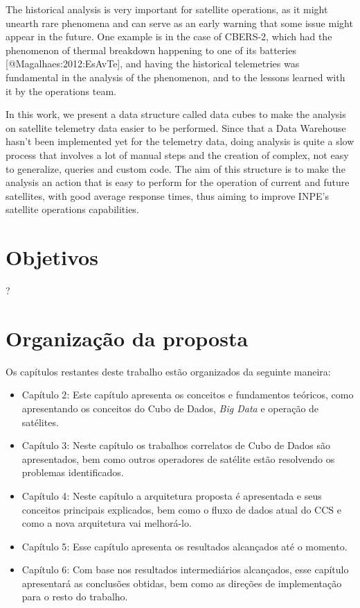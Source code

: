 The historical analysis is very important for satellite operations, as it might unearth rare phenomena and can serve as an early warning that some issue might appear in the future.
One example is in the case of CBERS-2, which had the phenomenon of thermal breakdown happening to one of its batteries [@Magalhaes:2012:EsAvTe], and having the historical telemetries was fundamental in the analysis of the phenomenon, and to the lessons learned with it by the operations team.

In this work, we present a data structure called data cubes to make the analysis on satellite telemetry data easier to be performed.
Since that a Data Warehouse hasn't been implemented yet for the telemetry data, doing analysis is quite a slow process that involves a lot of manual steps and the creation of complex, not easy to generalize, queries and custom code.
The aim of this structure is to make the analysis an action that is easy to perform for the operation of current and future satellites, with good average response times, thus aiming to improve INPE's satellite operations capabilities.

\section{Objetivos}

{\color{red} ?}

\section{Organização da proposta}

Os capítulos restantes deste trabalho estão organizados da seguinte maneira:

\begin{itemize}
	\item{Capítulo 2}: Este capítulo apresenta os conceitos e fundamentos teóricos, como apresentando os conceitos do Cubo de Dados, \textit{Big Data} e operação de satélites.
	\item{Capítulo 3}: Neste capítulo os trabalhos correlatos de Cubo de Dados são apresentados, bem como outros operadores de satélite estão resolvendo os problemas identificados.
	\item{Capítulo 4}: Neste capítulo a arquitetura proposta é apresentada e seus conceitos principais explicados, bem como o fluxo de dados atual do CCS e como a nova arquitetura vai melhorá-lo.
	\item{Capítulo 5}: Esse capítulo apresenta os resultados alcançados até o momento.
	\item{Capítulo 6}: Com base nos resultados intermediários alcançados, esse capítulo apresentará as conclusões obtidas, bem como as direções de implementação para o resto do trabalho.
\end{itemize}

